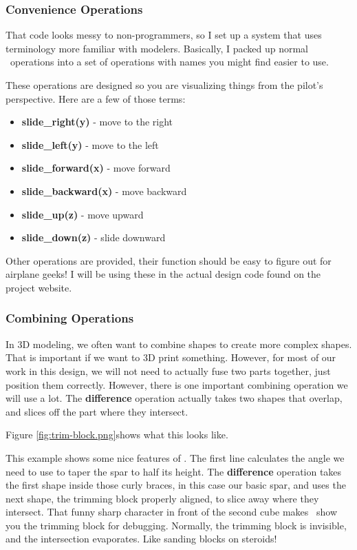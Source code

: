 \subsubsection{Convenience Operations}

That code looks messy to non-programmers, so I set up a system that uses
terminology more familiar with modelers. Basically, I packed up normal \osc\
operations into a set of operations with names you might find easier to use.

These operations are designed so you are visualizing things from the pilot's
perspective.  Here are a few of those terms:

\begin{itemize}
  \item{{\bf slide\_right(y)} - move to the right}
  \item{{\bf slide\_left(y)} - move to the left}
  \item{{\bf slide\_forward(x)} - move forward}
  \item{{\bf slide\_backward(x)} - move backward}
  \item{{\bf slide\_up(z)} - move upward}
  \item{{\bf slide\_down(z)} - slide downward}
\end{itemize}

Other operations are provided, their function should be easy to figure out for
airplane geeks! I will be using these in the actual design code found on the
project website.

\subsubsection{Combining Operations}

In 3D modeling, we often want to combine shapes to create more complex shapes.
That is important if we want to 3D print something. However, for most of our
work in this design, we will not need to actually fuse two parts together, just
position them correctly. However, there is one important combining operation we
will use a lot. The {\bf difference} operation actually takes two shapes that
overlap, and slices off the part where they intersect.


Figure \ref{fig:trim-block.png}shows what this looks like.



This example shows some nice features of \osc. The first line calculates the
angle we need to use to taper  the spar to half its height. The {\bf
difference} operation takes the first shape inside those curly braces, in this
case our basic spar, and uses the next shape, the trimming block properly
aligned, to slice away where they intersect. That funny sharp character in front
of the second cube makes \osc\ show you the trimming block for debugging.
Normally, the trimming block is invisible, and the intersection evaporates.
Like sanding blocks on steroids!

